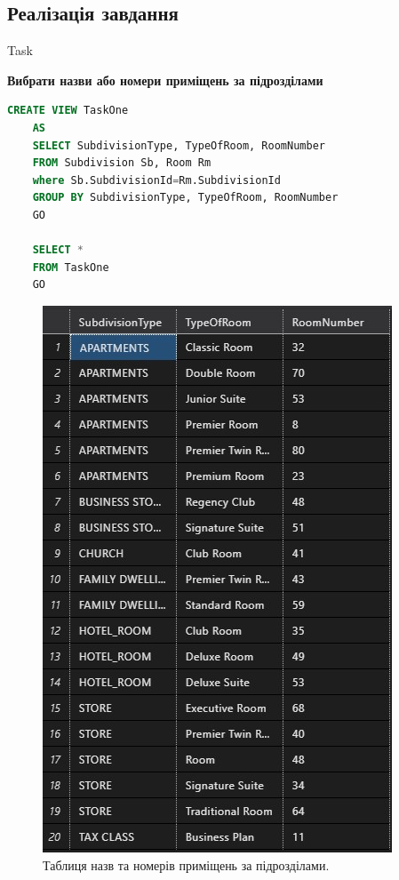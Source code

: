 \documentclass[a4paper,12pt]{article}
\newcommand{\RomanNumeralCaps}[1]{\MakeUppercase{\romannumeral #1}}
\begin{document}
\newpage
	\begin{center}
		\section*{\bfseries{Реалізація завдання}}
	\end{center}
    \begin{center}
        \Large{Task \RomanNumeralCaps{1}}
    \end{center}
	\textbf{Вибрати назви або номери приміщень за підрозділами}
	\begin{lstlisting}[language=SQL]
	CREATE VIEW TaskOne
	AS
	SELECT SubdivisionType, TypeOfRoom, RoomNumber
	FROM Subdivision Sb, Room Rm
	where Sb.SubdivisionId=Rm.SubdivisionId
	GROUP BY SubdivisionType, TypeOfRoom, RoomNumber
	GO
	
	SELECT * 
	FROM TaskOne
	GO
	\end{lstlisting}
	\begin{figure}[h!]
		\begin{minipage}[h]{1\linewidth}
			\centering
			\includegraphics[width=0.6\linewidth]{Prt sc/Figure_1.jpg}  
		\end{minipage}
		\caption{Таблиця назв та номерів приміщень за підрозділами.}
	\end{figure}
	
\end{document}
